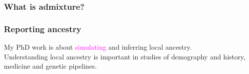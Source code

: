 \documentclass[11pt, mathserif, aspectratio=169]{beamer}
\newcommand{\magenta}[1]{\textcolor{magenta}{#1}}
\newenvironment{wideitemize}{\itemize\addtolength{\itemsep}{10pt}}{\enditemize}
\begin{document}
%
%

\begin{frame}
\frametitle{What is admixture?}
\begin{center}

\end{center}
\end{frame}


\begin{frame}
\frametitle{Reporting ancestry}
\begin{center}

\end{center}
My PhD work is about \magenta{simulating} and inferring local ancestry.\\[2mm]

Understanding local ancestry is important in studies of demography and history, medicine and genetic pipelines.
\end{frame}

%
%
\end{document}
